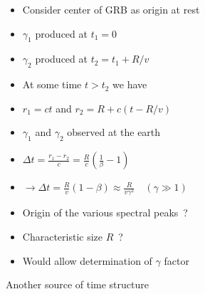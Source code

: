\newpage

\begin{itemize}
\item Consider center of GRB as origin at rest
\item[] $\gamma_{1}$ produced at $t_{1}=0$
\item[] $\gamma_{2}$ produced at $t_{2}=t_{1}+R/v$
\item[] At some time $t>t_{2}$ we have
\item[] $r_{1}=ct$ and $r_{2}=R+c(t-R/v)$
\item $\gamma_{1}$ and $\gamma_{2}$ observed at the earth
\item[] $\displaystyle \Delta t=\frac{r_{1}-r_{2}}{c}=\frac{R}{c}\left(\frac{1}{\beta}-1\right)$
\item[] $\displaystyle \rightarrow \Delta t=\frac{R}{v}(1-\beta)
          \approx \frac{R}{v \gamma^{2}} \quad (\gamma \gg 1)$
\item[] {\blue Origin of the various spectral peaks~?}
\item Characteristic size $R$~?
\item[] Would allow determination of $\gamma$ factor
\end{itemize}

\Tr
\begin{center}
{\red Another source of time structure}
\end{center}

\vspace*{0.5cm}

